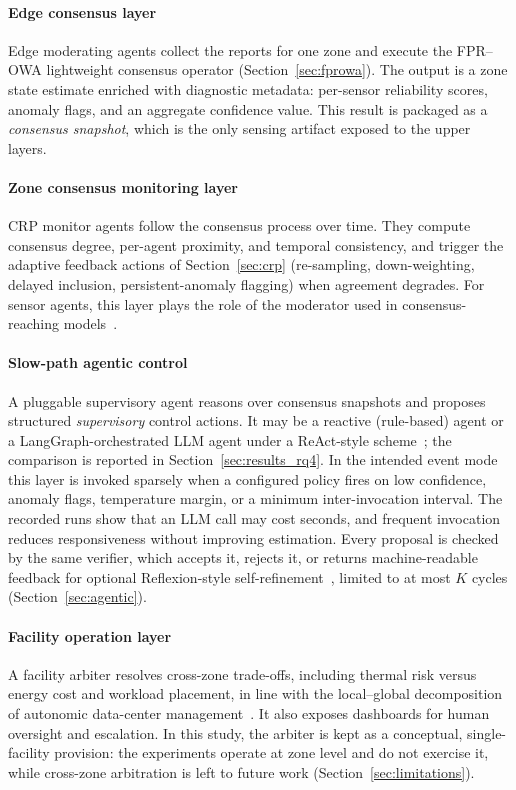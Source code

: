 \documentclass[smartcities,article,submit,moreauthors]{Definitions/mdpi}
\begin{document}
\paragraph{Edge consensus layer}
Edge moderating agents collect the reports for one zone and execute the
FPR--OWA lightweight consensus operator
(Section~\ref{sec:fprowa}). The output is a zone state estimate enriched
with diagnostic metadata: per-sensor reliability scores, anomaly flags,
and an aggregate confidence value. This result is packaged as a
\emph{consensus snapshot}, which is the only sensing artifact exposed to
the upper layers.

\paragraph{Zone consensus monitoring layer}
CRP monitor agents follow the consensus process over time. They compute
consensus degree, per-agent proximity, and temporal consistency, and
trigger the adaptive feedback actions of Section~\ref{sec:crp}
(re-sampling, down-weighting, delayed inclusion, persistent-anomaly
flagging) when agreement degrades. For sensor agents, this layer plays
the role of the moderator used in consensus-reaching
models~\cite{cabrerizo2009,herreraviedma2007}.

\paragraph{Slow-path agentic control}
A pluggable supervisory agent reasons over consensus snapshots and
proposes structured \emph{supervisory} control actions. It may be a
reactive (rule-based) agent or a LangGraph-orchestrated LLM agent under a
ReAct-style scheme~\cite{yao2023react}; the comparison is reported in
Section~\ref{sec:results_rq4}. In the intended event mode this layer is invoked
sparsely when a configured policy fires on low confidence, anomaly flags,
temperature margin, or a minimum inter-invocation interval. The recorded runs
show that an LLM call may cost seconds, and frequent
invocation reduces responsiveness without improving estimation. Every
proposal is checked by the same verifier, which accepts it, rejects it,
or returns machine-readable feedback for optional Reflexion-style
self-refinement~\cite{shinn2023reflexion}, limited to at most $K$ cycles
(Section~\ref{sec:agentic}).

\paragraph{Facility operation layer}
A facility arbiter resolves cross-zone trade-offs, including thermal risk
versus energy cost and workload placement, in line with the
local--global decomposition of autonomic data-center
management~\cite{das2008,tesauro2004}. It also exposes dashboards for
human oversight and escalation. In this study, the arbiter is kept as a
conceptual, single-facility provision: the experiments operate at zone
level and do not exercise it, while cross-zone arbitration is left to
future work (Section~\ref{sec:limitations}).
\end{document}
